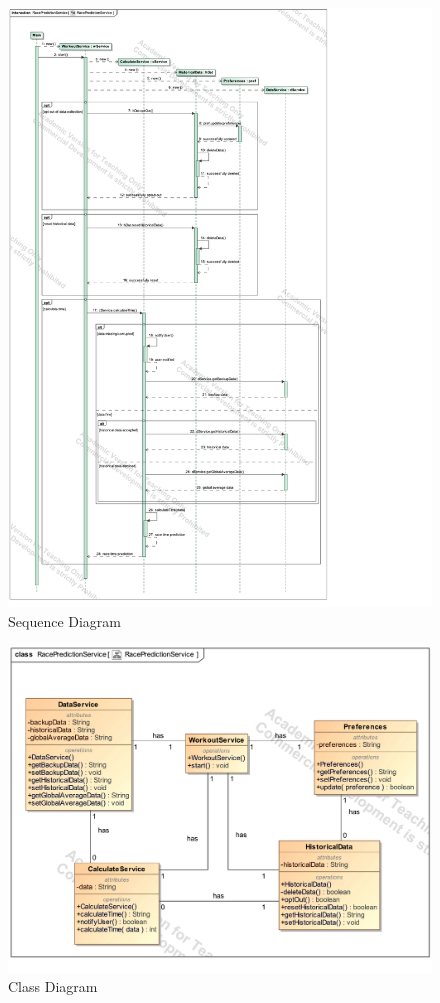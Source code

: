 \documentclass{article}
\begin{document}
		\clearpage
		\begin{figure}[h!]
			\centering
			\captionsetup{labelformat=empty}
			\caption{Sequence Diagram}
		    	\includegraphics[scale=0.75, angle=0]{Marc/race/RacePredictionServiceSequence.pdf}
		\end{figure}
		\clearpage
		\begin{figure}[h!]
			\centering
			\captionsetup{labelformat=empty}
			\caption{Class Diagram}
		    	\includegraphics[width=\textwidth, angle=0]{Marc/race/RacePredictionServiceClass.pdf}
		\end{figure}
		\clearpage	
\end{document}

